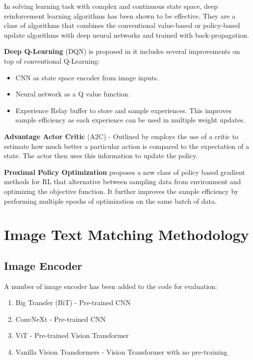 \documentclass[conference]{IEEEtran}
\begin{document}
In solving learning task with complex and continuous state space, deep reinforcement learning algorithms has been shown to be effective. They are a class of algorithms that combines the conventional value-based or policy-based update algorithms with deep neural networks and trained with back-propagation.

\textbf{Deep Q-Learning} (DQN) is proposed in \cite{mnihPlayingAtariDeep2013} it includes several improvements on top of conventional Q-Learning:

\begin{itemize}
    \item CNN as state space encoder from image inputs.
    \item Neural network as a Q value function.
    \item Experience Relay buffer to store and sample experiences. This improves sample efficiency as each experience can be used in multiple weight updates.
\end{itemize}

\textbf{Advantage Actor Critic} (A2C) - Outlined by \cite{plaatDeepReinforcementLearning2022} employs the use of a critic to estimate how much better a particular action is compared to the expectation of a state. The actor then uses this information to update the policy.

\textbf{Proximal Policy Optimization} \cite{schulmanProximalPolicyOptimization2017} proposes a new class of policy based gradient methods for RL that alternative between sampling data from environment and optimizing the objective function. It further improves the sample efficiency by performing multiple epochs of optimization on the same batch of data.

\section{Image Text Matching Methodology}

\subsection{Image Encoder}

A number of image encoder has been added to the code for evaluation:

\begin{enumerate}
    \item Big Transfer (BiT) - Pre-trained CNN
    \item ConvNeXt - Pre-trained CNN
    \item ViT - Pre-trained Vision Transformer
    \item Vanilla Vision Transformers - Vision Transformer with no pre-training
\end{enumerate}
\end{document}

